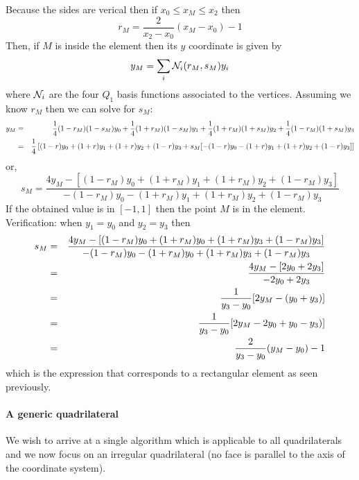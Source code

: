 \noindent Because the sides are verical then if $x_0 \leq x_M \leq x_2$ then 
\[
r_M = \frac{2}{x_2-x_0}(x_M-x_0) -1 
\]
Then, if $M$ is inside the element then its $y$ coordinate is given by
\[
y_M = \sum_i {\mathcal{N}}_i(r_M,s_M) y_i
\]
where ${\mathcal{N}}_i$ are the four $Q_1$ basis functions associated to the vertices.
Assuming we know $r_M$ then we can solve for $s_M$:
\begin{eqnarray}
y_M &=&  
\frac{1}{4}(1-r_M)(1-s_M) y_0+
\frac{1}{4}(1+r_M)(1-s_M) y_1+
\frac{1}{4}(1+r_M)(1+s_M) y_2+
\frac{1}{4}(1-r_M)(1+s_M) y_3 \nonumber\\
&=& 
\frac{1}{4} \left[
(1-r)y_0+(1+r)y_1+(1+r)y_2+(1-r)y_3 +s_M [ -(1-r)y_0 - (1+r)y_1+(1+r)y_2+(1-r)y_3  ] 
\right] \nonumber 
\end{eqnarray}
or, 
\[
s_M = \frac{ 4y_M - [(1-r_M)y_0+(1+r_M)y_1+(1+r_M)y_2+(1-r_M)y_3]  }{ -(1-r_M)y_0 -(1+r_M)y_1+(1+r_M)y_2+(1-r_M)y_3 } 
\]
If the obtained value is in $[-1,1]$ then the point $M$ is in the element.
Verification: when $y_1=y_0$ and $y_2=y_3$ then 
\begin{eqnarray}
s_M 
&=& \frac{4 y_M - [(1-r_M)y_0+(1+r_M)y_0+(1+r_M)y_3+(1-r_M)y_3]  }{ -(1-r_M)y_0 - (1+r_M)y_0+(1+r_M)y_3+(1-r_M)y_3 } \nonumber\\
&=& \frac{4 y_M - [ 2 y_0 + 2 y_3]  }{ -2 y_0 + 2 y_3    }  \nonumber\\
&=& \frac{1}{y_3-y_0} [2 y_M - (  y_0 +  y_3) ] \nonumber\\ 
&=& \frac{1}{y_3-y_0} [2 y_M -  2 y_0 +y_0 -  y_3)  ] \nonumber\\ 
&=& \frac{2}{y_3-y_0} (y_M - y_0) - 1 
\end{eqnarray}
which is the expression that corresponds to a rectangular element as seen previously.

\paragraph{A generic quadrilateral}

We wish to arrive at a single algorithm which is applicable to all quadrilaterals and we now focus  
on an irregular quadrilateral (no face is parallel to the axis of the coordinate system). 

\begin{center}
\\
\end{center}

